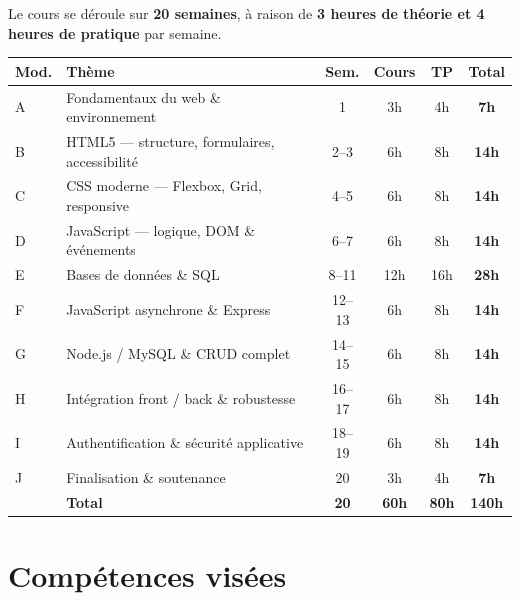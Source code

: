 \documentclass[a4paper,11pt]{article}
\begin{document}
Le cours se déroule sur \textbf{20 semaines}, à raison de \textbf{3 heures de théorie et 4 heures de pratique} par semaine.

\begin{center}
\begin{tabularx}{\linewidth}{lXccc>{\bfseries}c}
  \toprule
  \rowcolor{accentBlue}
  \color{white}\textbf{Mod.} &
  \color{white}\textbf{Thème} &
  \color{white}\textbf{Sem.} &
  \color{white}\textbf{Cours} &
  \color{white}\textbf{TP} &
  \color{white}\textbf{Total} \\
  \midrule
  \rowcolor{cfptGrey}
  A & Fondamentaux du web \& environnement & 1     & 3h  & 4h  & 7h \\
  B & HTML5 — structure, formulaires, accessibilité & 2--3  & 6h  & 8h  & 14h \\
  \rowcolor{cfptGrey}
  C & CSS moderne — Flexbox, Grid, responsive & 4--5  & 6h  & 8h  & 14h \\
  D & JavaScript — logique, DOM \& événements & 6--7  & 6h  & 8h  & 14h \\
  \rowcolor{cfptGrey}
  E & Bases de données \& SQL & 8--11 & 12h & 16h & 28h \\
  F & JavaScript asynchrone \& Express & 12--13 & 6h  & 8h  & 14h \\
  \rowcolor{cfptGrey}
  G & Node.js / MySQL \& CRUD complet & 14--15 & 6h  & 8h  & 14h \\
  H & Intégration front / back \& robustesse & 16--17 & 6h  & 8h  & 14h \\
  \rowcolor{cfptGrey}
  I & Authentification \& sécurité applicative & 18--19 & 6h  & 8h  & 14h \\
  J & Finalisation \& soutenance & 20    & 3h  & 4h  & 7h \\
  \midrule
  \rowcolor{accentBlue!15}
  & \textbf{Total} & \textbf{20} & \textbf{60h} & \textbf{80h} & \textbf{140h} \\
  \bottomrule
\end{tabularx}
\end{center}

\medskip
{}

\newpage

\section{Compétences visées}
\end{document}
